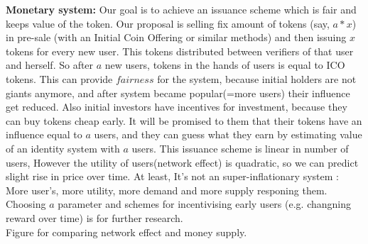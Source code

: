 \documentclass{article}
\begin{document}
\textbf{Monetary system:} Our goal is to achieve an issuance scheme which is fair and keeps value of the token. Our proposal is selling fix amount of tokens (say, $a*x$) in pre-sale (with an Initial Coin Offering  or similar methods) and then issuing $x$ tokens for every new user. This tokens distributed between verifiers of that user and herself. So after $a$ new users, tokens in the hands of users is equal to ICO tokens. This can provide $fairness$ for the system, because initial holders are not giants anymore, and after system became popular(=more users) their influence get reduced. Also initial investors have incentives for investment, because they can buy tokens cheap early. It will be promised to them that their tokens have an influence equal to $a$ users, and they can guess what they earn by estimating value of an identity system with $a$ users. This issuance scheme is linear in number of users, However the utility of users(network effect) is quadratic, so we can predict slight rise in price over time. At least, It's not an super-inflationary system : More user's, more utility, more demand and more supply responing them. Choosing $a$ parameter and schemes for incentivising early users (e.g. changning reward over time) is for further research.\\



Figure for comparing network effect and money supply.
\end{document}

